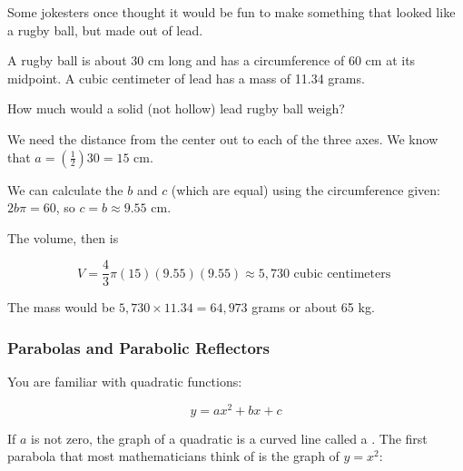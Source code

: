 \begin{Exercise}[title={Volume of a Rugby Ball}, label=rugby_ball]

  Some jokesters once thought it would be fun to make something that looked like a rugby ball, but made out of lead.

  A rugby ball is about 30 cm long and has a circumference of 60 cm at
  its midpoint. A cubic centimeter of lead has a mass of 11.34 grams.

  How much would a solid (not hollow) lead rugby ball weigh?

\end{Exercise}
\begin{Answer}[ref=rugby_ball]

  We need the distance from the center out to each of the three axes. We know that $a = \left(\frac{1}{2} \right) 30 = 15$ cm.

  We can calculate the $b$ and $c$ (which are equal) using the circumference given: $2b\pi = 60$, so $c = b \approx 9.55$ cm.

  The volume, then is

  $$V = \frac{4}{3} \pi (15)(9.55)(9.55) \approx 5,730 \text{ cubic centimeters }$$

  The mass would be $5,730 \times 11.34 = 64,973$ grams or about 65 kg.
\end{Answer}

\subsubsection{Parabolas and Parabolic Reflectors}

You are familiar with quadratic functions:

$$y = a x^2 + b x + c$$

If $a$ is not zero, the graph of a quadratic is a curved line called a
. The first parabola that most mathematicians think of is the graph of $y = x^2$:


